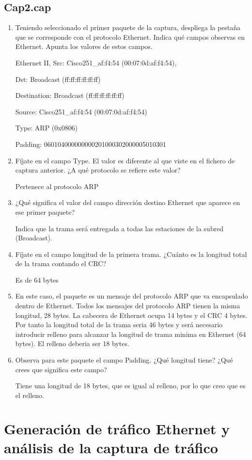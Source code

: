 \documentclass[12pt, a4paper]{report}
\begin{document}
\section{Cap2.cap}
\begin{enumerate}
	\item Teniendo seleccionado el primer paquete de la captura, despliega la pestaña que se corresponde con el
	protocolo Ethernet. Indica qué campos observas en Ethernet. Apunta los valores de estos campos.
	
	Ethernet II, Src: Cisco251\_af:f4:54 (00:07:0d:af:f4:54), 
	
	Dst: Broadcast (ff:ff:ff:ff:ff:ff)
	
	Destination: Broadcast (ff:ff:ff:ff:ff:ff)
	
	Source: Cisco251\_af:f4:54 (00:07:0d:af:f4:54)
	
	Type: ARP (0x0806)
	
	Padding: 060104000000000201000302000005010301
	\item Fíjate en el campo Type. El valor es diferente al que viste en el fichero de captura anterior. ¿A qué protocolo se refiere este valor?
	
	Pertenece al protocolo ARP
	\item ¿Qué significa el valor del campo dirección destino Ethernet que aparece en ese primer paquete?
	
	Indica que la trama será entregada a todas las estaciones de la subred (Broadcast).
	\item Fíjate en el campo longitud de la primera trama. ¿Cuánto es la longitud total de la trama contando el CRC?
	
	Es de 64 bytes
	\item En este caso, el paquete es un mensaje del protocolo ARP que va encapsulado dentro de Ethernet. Todos
	los mensajes del protocolo ARP tienen la misma longitud, 28 bytes. La cabecera de Ethernet ocupa 14 bytes
	y el CRC 4 bytes. Por tanto la longitud total de la trama seria 46 bytes y será necesario introducir relleno
	para alcanzar la longitud de trama minima en Ethernet (64 bytes). El relleno deberia ser 18 bytes.
	\item Observa para este paquete el campo Padding. ¿Qué longitud tiene? ¿Qué crees que significa este campo?
	
	Tiene una longitud de 18 bytes, que es igual al relleno, por lo que creo que es el relleno.
\end{enumerate}
\newpage

\chapter{Generación de tráfico Ethernet y análisis de la captura de tráfico}
\end{document}
